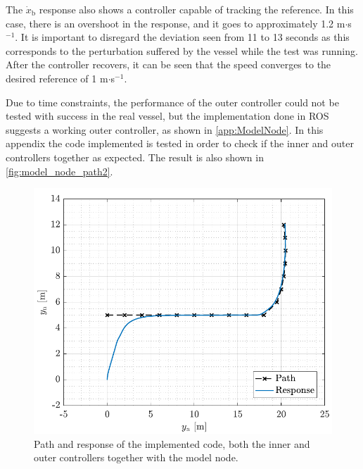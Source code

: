 The $\dot{x}_\mathrm{b}$ response also shows a controller capable of tracking the reference. In this case, there is an overshoot in the response, and it goes to approximately 1.2 m$\cdot$s$^{-1}$. It is important to disregard the deviation seen from 11 to 13 seconds as this corresponds to the perturbation suffered by the vessel while the test was running. After the controller recovers, it can be seen that the speed converges to the desired reference of 1 m$\cdot$s$^{-1}$. 

Due to time constraints, the performance of the outer controller could not be tested with success in the real vessel, but the implementation done in ROS suggests a working outer controller, as shown in \autoref{app:ModelNode}. In this appendix the code implemented is tested in order to check if the inner and outer controllers together as expected. The result is also shown in \autoref{fig:model_node_path2}.
\begin{figure}[H]
    \includegraphics[width=.45\textwidth]{figures/model_node_path}
    \caption{Path and response of the implemented code, both the inner and outer controllers together with the model node.}
    \label{fig:model_node_path2}
\end{figure}